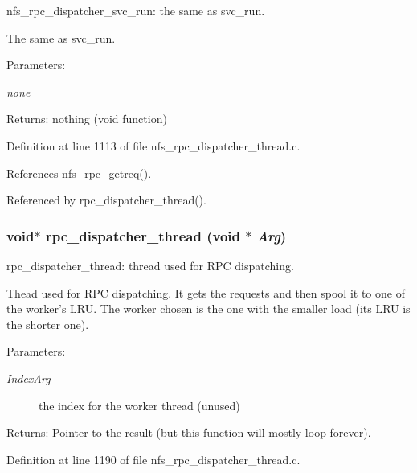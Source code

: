 nfs\_\-rpc\_\-dispatcher\_\-svc\_\-run: the same as svc\_\-run.

The same as svc\_\-run.

\begin{Desc}
\item[Parameters:]
\begin{description}
\item[{\em none}]\end{description}
\end{Desc}
\begin{Desc}
\item[Returns:]nothing (void function) \end{Desc}


Definition at line 1113 of file nfs\_\-rpc\_\-dispatcher\_\-thread.c.

References nfs\_\-rpc\_\-getreq().

Referenced by rpc\_\-dispatcher\_\-thread().
\subsubsection{\setlength{\rightskip}{0pt plus 5cm}void$\ast$ rpc\_\-dispatcher\_\-thread (void $\ast$ {\em Arg})}\label{nfs__rpc__dispatcher__thread_8c_a27}


rpc\_\-dispatcher\_\-thread: thread used for RPC dispatching.

Thead used for RPC dispatching. It gets the requests and then spool it to one of the worker's LRU. The worker chosen is the one with the smaller load (its LRU is the shorter one).

\begin{Desc}
\item[Parameters:]
\begin{description}
\item[{\em Index\-Arg}]the index for the worker thread (unused)\end{description}
\end{Desc}
\begin{Desc}
\item[Returns:]Pointer to the result (but this function will mostly loop forever). \end{Desc}


Definition at line 1190 of file nfs\_\-rpc\_\-dispatcher\_\-thread.c.

